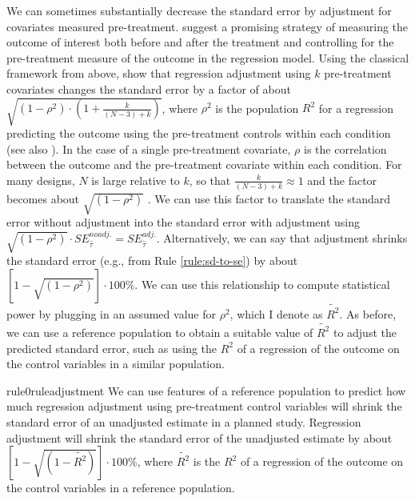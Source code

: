 \documentclass[12pt]{article}
\begin{document}
We can sometimes substantially decrease the standard error by adjustment
for covariates measured pre-treatment. 
\cite{Clifford2021} suggest a promising strategy of measuring the outcome of interest both before and after the treatment and controlling for the pre-treatment measure of the outcome in the regression model. 
Using the classical framework from above, \citet[547]{Cox1982} show that regression adjustment using $k$ pre-treatment covariates changes the standard error by a factor of about $\sqrt{\left( 1 - \rho^{2} \right) \cdot \left( 1 + \frac{k}{(N - 3) + k} \right)}$, where $\rho^{2}$ is the population $R^{2}$ for a regression predicting the outcome using the pre-treatment controls within each condition (see also \citealt{Boldt2024}).
In the case of a single pre-treatment covariate, $\rho$ is the correlation between the outcome and the pre-treatment covariate within each condition. 
For many designs, $N$ is large relative to $k$, so that $\frac{k}{(N - 3) + k} \approx 1$ and the factor becomes about $\sqrt{\left( 1 - \rho^{2} \right)}$ \citep{Bloom1995, Meyvis2017}. 
We can use this factor to translate the standard error without adjustment into the standard error with adjustment using $\sqrt{\left( 1 - \rho^{2} \right)} \cdot SE_{\widehat{\tau}}^{noadj.} = SE_{\widehat{\tau}}^{adj.}$. 
Alternatively, we can say that adjustment shrinks the standard error (e.g., from Rule \ref{rule:sd-to-se}) by about $\left\lbrack 1 - \sqrt{\left( 1 - \rho^{2} \right)} \right\rbrack \cdot 100\%$.
We can use this relationship to compute statistical power by plugging in an assumed value for $\rho^{2}$, which I denote as $\widetilde{R^{2}}$.
As before, we can use a reference population to obtain a suitable value of $\widetilde{R^{2}}$ to adjust the predicted standard error, such as using the $R^{2}$ of a regression of the outcome on the control variables in a similar population.

\begin{restatable}[Adjustment]{rule0}{ruleadjustment}
\label{rule:adjustment}
We can use features of a reference population to predict how much regression adjustment using pre-treatment control variables will shrink the standard error of an unadjusted estimate in a planned study. Regression adjustment will shrink the standard error of the unadjusted estimate by about $\left\lbrack 1 - \sqrt{\left( 1 - \widetilde{R^{2}} \right)} \right\rbrack \cdot 100\%$, where $\widetilde{R^2}$ is the $R^2$ of a regression of the outcome on the control variables in a reference population.
\end{restatable}
\end{document}
